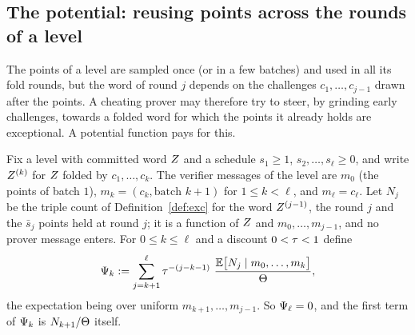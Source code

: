 \subsection{The potential: reusing points across the rounds of a level}\label{sec:potential}

The points of a level are sampled once (or in a few batches) and used in all its fold rounds, but the word of round $j$ depends on the challenges $c_1,\dots,c_{j-1}$ drawn after the points. A cheating prover may therefore try to steer, by grinding early challenges, towards a folded word for which the points it already holds are exceptional. A potential function pays for this.

Fix a level with committed word $Z$ and a schedule $s_1\ge1$, $s_2,\dots,s_\ell\ge0$, and write $Z^{(k)}$ for $Z$ folded by $c_1,\dots,c_k$. The verifier messages of the level are $m_0$ (the points of batch $1$), $m_k=(c_k,\text{batch }k+1)$ for $1\le k<\ell$, and $m_\ell=c_\ell$. Let $N_j$ be the triple count of Definition~\ref{def:exc} for the word $Z^{(j-1)}$, the round $j$ and the $\bar s_j$ points held at round $j$; it is a function of $Z$ and $m_0,\dots,m_{j-1}$, and no prover message enters. For $0\le k\le\ell$ and a discount $0<\tau<1$ define
\begin{equation}\label{eq:pot}
\Psi_k:=\sum_{j=k+1}^{\ell}\tau^{-(j-k-1)}\ \frac{\mathbb{E}\bigl[N_j\mid m_0,\dots,m_k\bigr]}{\Theta},
\end{equation}
the expectation being over uniform $m_{k+1},\dots,m_{j-1}$. So $\Psi_\ell=0$, and the first term of $\Psi_k$ is $N_{k+1}/\Theta$ itself.

